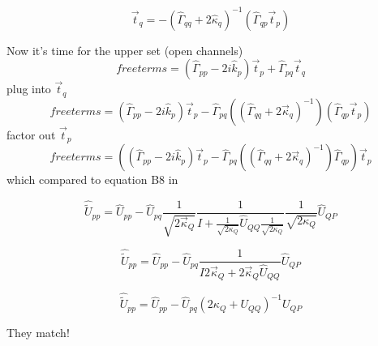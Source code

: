 \begin{equation}
\vec{t}_q = -(\hat{\Gamma}_{qq} + 2 \hat{\kappa}_q)^{-1} (\hat{\Gamma}_{qp} \vec{t}_p)
\end{equation}

Now it's time for the upper set (open channels)
\begin{equation}
free terms = (\hat{\Gamma}_{pp}-2 i \hat{k}_p)\vec{t}_p + \hat{\Gamma}_{pq} \vec{t}_q
\end{equation}
plug into $\vec{t}_q$
\begin{equation}
free terms = (\hat{\Gamma}_{pp}-2 i \hat{k}_p)\vec{t}_p - \hat{\Gamma}_{pq} 
((\hat{\Gamma}_{qq}+2 \vec{\kappa}_q)^{-1})(\hat{\Gamma}_{qp} \vec{t}_p)
\end{equation}
factor out $\vec{t}_p$
\begin{equation}
free terms = ((\hat{\Gamma}_{pp}-2 i \hat{k}_p)\vec{t}_p - \hat{\Gamma}_{pq} 
((\hat{\Gamma}_{qq}+2 \vec{\kappa}_q)^{-1})\hat{\Gamma}_{qp}) \vec{t}_p
\end{equation}
which compared to equation B8 in \cite{2007_Froufe-Perez_PRE}

\begin{equation}
\hat{\tilde{U}}_{pp} = \hat{U}_{pp} - \hat{U}_{pq} 
\frac{1}{\sqrt{2 \vec{\kappa}_Q}}\frac{1}{I+
\frac{1}{\sqrt{2 \kappa_Q}}\hat{U}_{QQ}\frac{1}{\sqrt{2 \kappa_Q}} }
\frac{1}{\sqrt{2 \kappa_Q}}\hat{U}_{QP}
\end{equation}

\begin{equation}
\hat{\tilde{U}}_{pp} = \hat{U}_{pp} - \hat{U}_{pq}
\frac{1}{I 2 \vec{\kappa}_Q + 2 \vec{\kappa}_Q \hat{U}_{QQ}}\hat{U}_{QP}
\end{equation}

\begin{equation}
\hat{\tilde{U}}_{pp} = \hat{U}_{pp} - \hat{U}_{pq} (2 \kappa_Q + U_{QQ})^{-1} U_{QP}
\end{equation}

They match!
